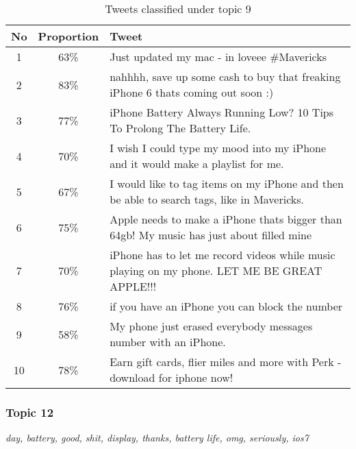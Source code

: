 \begin{table}[H]
  \begin{tabular}{c c p{13cm}} \toprule
    No & Proportion & Tweet \\ \midrule
    1  & 63\%       & Just updated my mac - in loveee \#Mavericks \\ \midrule
    2  & 83\%       & nahhhh, save up some cash to buy that freaking iPhone 6 thats coming out soon :) \\ \midrule
    3  & 77\%       & iPhone Battery Always Running Low? 10 Tips To Prolong The Battery Life. \\ \midrule
    4  & 70\%       & I wish I could type my mood into my iPhone and it would make a playlist for me. \\ \midrule
    5  & 67\%       & I would like to tag items on my iPhone and then be able to search tags, like in Mavericks. \\ \midrule
    6  & 75\%       & Apple needs to make a iPhone thats bigger than 64gb! My music has just about filled mine \\ \midrule
    7  & 70\%       & iPhone has to let me record videos while music playing on my phone. LET ME BE GREAT APPLE!!! \\ \midrule
    8  & 76\%       & if you have an iPhone you can block the number \\ \midrule
    9  & 58\%       & My phone just erased everybody messages number with an iPhone. \\ \midrule
    10 & 78\%       & Earn gift cards, flier miles and more with Perk - download for iphone now! \\ \bottomrule
  \end{tabular}
  \caption{Tweets classified under topic 9}
  \label{tab:tweets_under_9}
\end{table}



\subsubsection{Topic 12}
\label{sec:topic_12}
\textit{day, battery, good, shit, display, thanks, battery life, omg, seriously, ios7}\\\\

